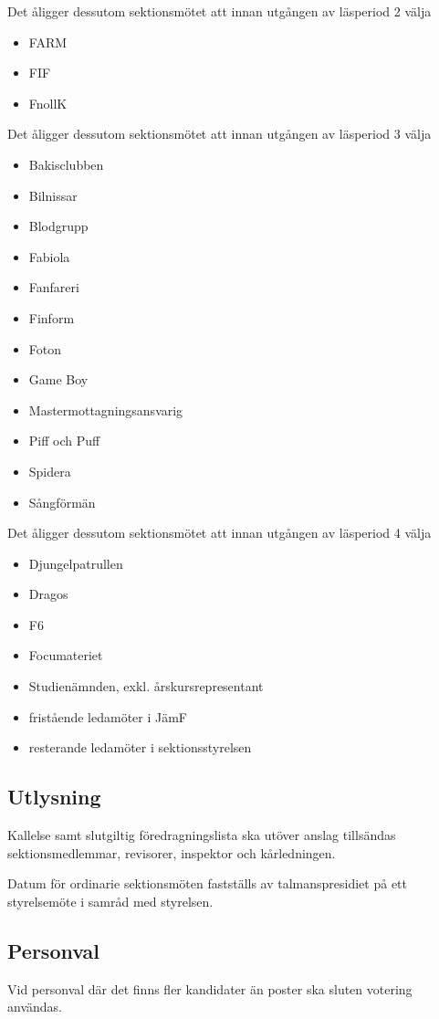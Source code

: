 \documentclass{styrdokument}
\begin{document}
\? Det åligger dessutom sektionsmötet att innan utgången av läsperiod 2 välja
\begin{itemize}
    \item FARM
    \item FIF
    \item FnollK
\end{itemize}

\? Det åligger dessutom sektionsmötet att innan utgången av läsperiod 3 välja
\begin{itemize}
    \item Bakisclubben
    \item Bilnissar
    \item Blodgrupp
    \item Fabiola
    \item Fanfareri
    \item Finform
    \item Foton
    \item Game Boy
    \item Mastermottagningsansvarig
    \item Piff och Puff
    \item Spidera
    \item Sångförmän
\end{itemize}

\? Det åligger dessutom sektionsmötet att innan utgången av läsperiod 4 välja
\begin{itemize}
    \item Djungelpatrullen
    \item Dragos
    \item F6
    \item Focumateriet
    \item Studienämnden, exkl. årskursrepresentant
    \item fristående ledamöter i JämF
    \item resterande ledamöter i sektionsstyrelsen
\end{itemize}

\subsection{Utlysning}
\? Kallelse samt slutgiltig föredragningslista ska utöver anslag tillsändas sektionsmedlemmar, revisorer, inspektor och kårledningen.

\? Datum för ordinarie sektionsmöten fastställs av talmanspresidiet på ett styrelsemöte i samråd med styrelsen.

\subsection{Personval}
\? Vid personval där det finns fler kandidater än poster ska sluten votering användas.
\end{document}
